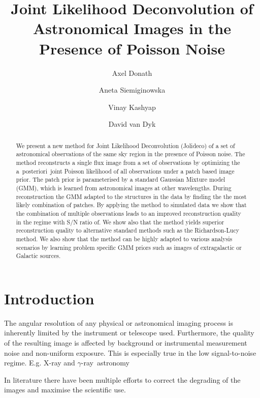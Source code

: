 \documentclass[twocolumn]{aastex631}
\newcommand{\aposteriori}{a~posteriori~}
\newcommand{\gammaray}{$\gamma$-ray\xspace}
\newcommand{\xray}{X-ray\xspace}
\begin{document}
    \title{Joint Likelihood Deconvolution of Astronomical Images in the Presence of Poisson Noise}

    \author[0000-0003-4568-7005]{Axel Donath}
    \author[0000-0002-0905-7375]{Aneta Siemiginowska}
    \author[0000-0002-3869-7996]{Vinay Kashyap}
    \author[0000-0000-0000-0000]{David van Dyk}


    \begin{abstract}
        We present a new method for Joint Likelihood Deconvolution (Jolideco) of a set of astronomical observations of the same sky region in the presence of Poisson noise.
        The method reconstructs a single flux image from a set of observations
        by optimizing the \aposteriori joint Poisson likelihood of all
        observations under a patch based image prior. The patch
        prior is parameterised by a standard Gaussian Mixture model (GMM), which is
        learned from astronomical images at other wavelengths.
        During reconstruction the GMM adapted to the structures
        in the data by finding the the most likely combination of 
        patches. 
        By applying the method to simulated data we show that
        the combination of multiple observations leads to an
        improved reconstruction quality in the regime with S/N ratio of.
        We show also that the method yields superior reconstruction quality
        to alternative standard methods such as the Richardson-Lucy method.
        We also show that the method can be highly adapted to various 
        analysis scenarios by learning problem specific GMM priors
        such as images of extragalactic or Galactic sources.
    \end{abstract}



    \section{Introduction}
    The angular resolution of any physical or astronomical imaging process is inherently limited by the instrument or telescope used. Furthermore, the quality of the resulting image is affected by background or instrumental measurement noise and non-uniform exposure. This is especially true in the low signal-to-noise regime. E.g. \xray and \gammaray~astronomy

    In literature there have been multiple efforts to correct the degrading of the images
    and maximise the scientific use. 
    
\end{document}
